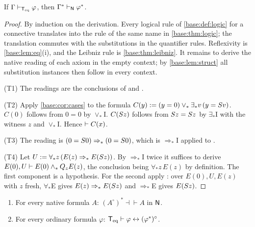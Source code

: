 \begin{proposition}
\label{base:prop:complete}
If $\Gamma\vdash_{\mathsf{T}_{\mathrm{eq}}}\varphi$, then $\Gamma^{*}\vdash_{\mathsf{N}}\varphi^{*}$.
\end{proposition}

\begin{proof}
By induction on the derivation.  Every logical rule of
\cref{base:def:logic} for a connective translates into the rule of the same
name in \cref{base:thm:logic}; the translation commutes with the
substitutions in the quantifier rules.  Reflexivity is
\cref{base:lem:eq}(i), and the Leibniz rule is \cref{base:thm:leibniz}.  It
remains to derive the native reading of each axiom in the empty context; by
\cref{base:lem:struct} all substitution instances then follow in every
context.

(T1) The readings are the conclusions of  and .

(T2) Apply \cref{base:cor:cases} to the formula
$C(y)\mathrel{:=}(y=0)\vee_*\exists_* v\,(y=S v)$.  $C(0)$ follows from $0=0$
by $\vee_*$I.  $C(S z)$ follows from $S z=S z$ by $\exists_*$I with
the witness $z$ and $\vee_*$I.  Hence $\vdash C(x)$.

(T3) The reading is $(0=S 0)\Rightarrow_*(0=S 0)$, which is
$\Rightarrow_*$I applied to .

(T4) Let $U\mathrel{:=}\forall_* z\,(E(z)\Rightarrow_* E(S z))$.  By
$\Rightarrow_*$I twice it suffices to derive
$E(0),U\vdash E(0)\wedge_*Q_{z}E(z)$, the conclusion being
$\forall_* z\,E(z)$ by definition.  The first component is a hypothesis.
For the second apply : over $E(0),U,E(z)$ with $z$ fresh,
$\forall_*$E gives $E(z)\Rightarrow_* E(S z)$ and $\Rightarrow_*$E gives
$E(S z)$.
\end{proof}

\begin{proposition}
\label{base:prop:roundtrip}
\begin{enumerate}[label=\textup{(\roman*)}]
\item For every native formula $A$: $(A^\circ)^{*}\dashv\vdash A$ in $\mathsf{N}$.
\item For every ordinary formula $\varphi$:
 $\mathsf{T}_{\mathrm{eq}}\vdash\varphi\leftrightarrow(\varphi^{*})^\circ$.
\end{enumerate}
\end{proposition}

